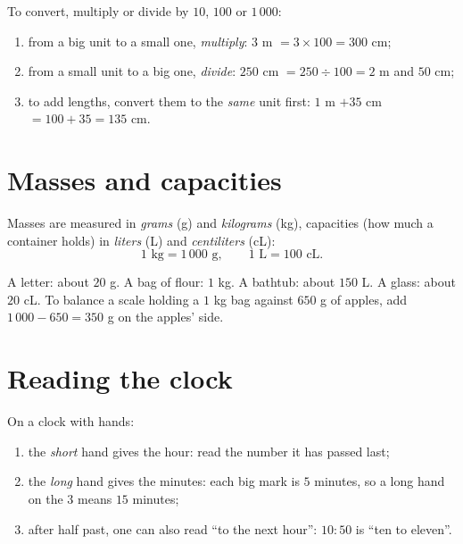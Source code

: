 \begin{method}\label{met:g3:measure:convert}
To convert, multiply or divide by $10$, $100$ or $1\,000$:
\begin{enumerate}
  \item from a big unit to a small one, \emph{multiply}:
        $3$ m $= 3 \times 100 = 300$ cm;
  \item from a small unit to a big one, \emph{divide}:
        $250$ cm $= 250 \div 100 = 2$ m and $50$ cm;
  \item to add lengths, convert them to the \emph{same} unit first:
        $1$ m $+ 35$ cm $= 100 + 35 = 135$ cm.
\end{enumerate}
\end{method}

\section{Masses and capacities}

\begin{definition}\label{def:g3:measure:mass}
Masses are measured in \emph{grams} (g) and \emph{kilograms} (kg),
capacities (how much a container holds) in \emph{liters} (L) and
\emph{centiliters} (cL):
\[
1 \text{ kg} = 1\,000 \text{ g},
\qquad
1 \text{ L} = 100 \text{ cL}.
\]
\end{definition}

\begin{example}\label{ex:g3:measure:mass}
A letter: about $20$ g. A bag of flour: $1$ kg. A bathtub: about
$150$ L. A glass: about $20$ cL. To balance a scale holding a
$1$ kg bag against $650$ g of apples, add $1\,000 - 650 = 350$ g on
the apples' side.
\end{example}

\section{Reading the clock}

\begin{method}\label{met:g3:measure:clock}
On a clock with hands:
\begin{enumerate}
  \item the \emph{short} hand gives the hour: read the number it has
        passed last;
  \item the \emph{long} hand gives the minutes: each big mark is $5$
        minutes, so a long hand on the $3$ means $15$ minutes;
  \item after half past, one can also read ``to the next hour'':
        $10{:}50$ is ``ten to eleven''.
\end{enumerate}
\end{method}

